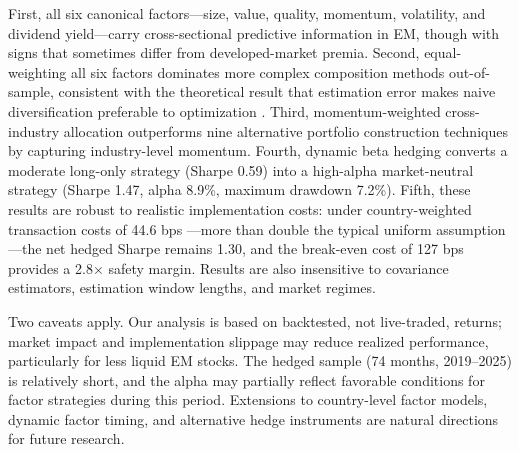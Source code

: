 \documentclass[12pt]{article}
\begin{document}
First, all six canonical factors---size, value, quality, momentum, volatility, and dividend yield---carry cross-sectional predictive information in EM, though with signs that sometimes differ from developed-market premia. Second, equal-weighting all six factors dominates more complex composition methods out-of-sample, consistent with the theoretical result that estimation error makes naive diversification preferable to optimization \citep{demiguel2009}. Third, momentum-weighted cross-industry allocation outperforms nine alternative portfolio construction techniques by capturing industry-level momentum. Fourth, dynamic beta hedging converts a moderate long-only strategy (Sharpe 0.59) into a high-alpha market-neutral strategy (Sharpe 1.47, alpha 8.9\%, maximum drawdown 7.2\%). Fifth, these results are robust to realistic implementation costs: under country-weighted transaction costs of 44.6 bps \citep{domowitz2001}---more than double the typical uniform assumption---the net hedged Sharpe remains 1.30, and the break-even cost of 127 bps provides a 2.8$\times$ safety margin. Results are also insensitive to covariance estimators, estimation window lengths, and market regimes.

Two caveats apply. Our analysis is based on backtested, not live-traded, returns; market impact and implementation slippage may reduce realized performance, particularly for less liquid EM stocks. The hedged sample (74 months, 2019--2025) is relatively short, and the alpha may partially reflect favorable conditions for factor strategies during this period. Extensions to country-level factor models, dynamic factor timing, and alternative hedge instruments are natural directions for future research.


\newpage


\end{document}
